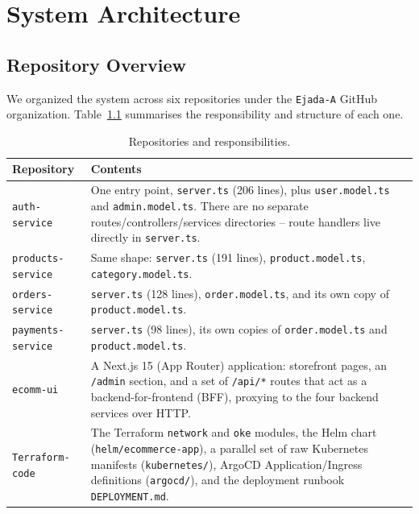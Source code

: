\chapter{System Architecture}\label{chap:background}

\section{Repository Overview}\label{sec:repo-overview}
We organized the system across six repositories under the \texttt{Ejada-A}
GitHub organization. Table~\ref{tab:repo-overview} summarises the responsibility
and structure of each one.

\begin{table}[H]
\centering
\caption{Repositories and responsibilities.}
\label{tab:repo-overview}
\small
\begin{tabularx}{\textwidth}{>{\raggedright\arraybackslash}p{3.2cm}
                >{\raggedright\arraybackslash}X}
\toprule
\textbf{Repository} & \textbf{Contents} \\
\midrule
\texttt{auth-\allowbreak service} & One entry point, \texttt{server.ts} (206 lines), plus \texttt{user.model.ts} and \texttt{admin.model.ts}. There are no separate routes/controllers/services directories -- route handlers live directly in \texttt{server.ts}. \\
\texttt{products-\allowbreak service} & Same shape: \texttt{server.ts} (191 lines), \texttt{product.model.ts}, \texttt{category.model.ts}. \\
\texttt{orders-\allowbreak service} & \texttt{server.ts} (128 lines), \texttt{order.model.ts}, and its own copy of \texttt{product.model.ts}. \\
\texttt{payments-\allowbreak service} & \texttt{server.ts} (98 lines), its own copies of \texttt{order.model.ts} and \texttt{product.model.ts}. \\
\texttt{ecomm-ui} & A Next.js 15 (App Router) application: storefront pages, an \texttt{/admin} section, and a set of \texttt{/api/*} routes that act as a backend-for-frontend (BFF), proxying to the four backend services over HTTP. \\
\texttt{Terraform-\allowbreak code} & The Terraform \texttt{network} and \texttt{oke} modules, the Helm chart (\texttt{helm/ecommerce-app}), a parallel set of raw Kubernetes manifests (\texttt{kubernetes/}), ArgoCD Application/Ingress definitions (\texttt{argocd/}), and the deployment runbook \texttt{DEPLOYMENT.md}. \\
\bottomrule
\end{tabularx}
\end{table}

